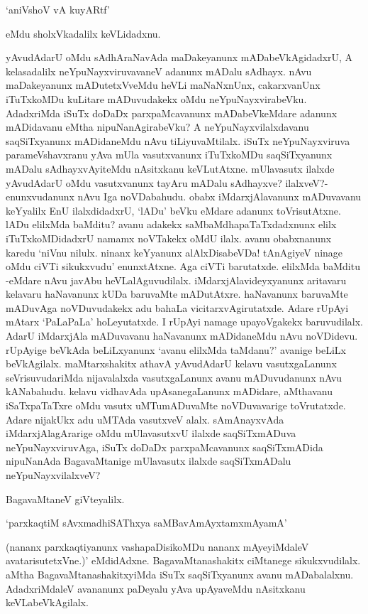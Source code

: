 \begin{shloka}
`aniVshoV vA kuyARtf'
\end{shloka}

eMdu sholxVkadalilx keVLidadxnu.

yAvudAdarU oMdu sAdhAraNavAda maDakeyanunx mADabeVkAgidadxrU, A kelasadalilx neYpuNayxviruvavaneV adanunx mADalu sAdhayx. nAvu maDakeyanunx mADutetxVveMdu heVLi maNaNxnUnx, cakarxvanUnx iTuTxkoMDu kuLitare mADuvudakekx oMdu neYpuNayxvirabeVku. AdadxriMda iSuTx doDaDx parxpaMcavanunx mADabeVkeMdare adanunx mADidavanu eMtha nipuNanAgirabeVku? A neYpuNayxvilalxdavanu saqSiTxyanunx mADidaneMdu nAvu tiLiyuvaMtilalx. iSuTx neYpuNayxviruva parameVshavxranu yAva mUla vasutxvanunx iTuTxkoMDu saqSiTxyanunx mADalu sAdhayxvAyiteMdu nAsitxkanu keVLutAtxne. mUlavasutx ilalxde yAvudAdarU oMdu vasutxvanunx tayAru mADalu sAdhayxve? ilalxveV?- enunxvudanunx nAvu Iga noVDabahudu. obabx iMdarxjAlavanunx mADuvavanu keYyalilx EnU ilalxdidadxrU, `lADu' beVku eMdare adanunx toVrisutAtxne. lADu elilxMda baMditu? avanu adakekx saMbaMdhapaTaTxdadxnunx elilx iTuTxkoMDidadxrU namamx noVTakekx oMdU ilalx. avanu obabxnanunx karedu `niVnu nilulx. ninanx keYyanunx alAlxDisabeVDa! tAnAgiyeV ninage oMdu ciVTi sikukxvudu' enunxtAtxne. Aga ciVTi barutatxde. elilxMda baMditu -eMdare nAvu javAbu heVLalAguvudilalx. iMdarxjAlavideyxyanunx aritavaru kelavaru haNavanunx kUDa baruvaMte mADutAtxre. haNavanunx baruvaMte mADuvAga noVDuvudakekx adu bahaLa vicitarxvAgirutatxde. Adare rUpAyi mAtarx `PaLaPaLa' hoLeyutatxde. I rUpAyi namage upayoVgakekx baruvudilalx. AdarU iMdarxjAla mADuvavanu haNavanunx mADidaneMdu nAvu noVDidevu. rUpAyige beVkAda beLiLxyanunx `avanu elilxMda taMdanu?' avanige beLiLx beVkAgilalx. maMtarxshakitx athavA yAvudAdarU kelavu vasutxgaLanunx seVrisuvudariMda nijavalalxda vasutxgaLanunx avanu mADuvudanunx nAvu kANabahudu. kelavu vidhavAda upAsanegaLanunx mADidare, aMthavanu iSaTxpaTaTxre oMdu vasutx uMTumADuvaMte noVDuvavarige toVrutatxde. Adare nijakUkx adu uMTAda vasutxveV alalx. sAmAnayxvAda iMdarxjAlagArarige oMdu mUlavasutxvU ilalxde saqSiTxmADuva neYpuNayxviruvAga, iSuTx doDaDx parxpaMcavanunx saqSiTxmADida nipuNanAda BagavaMtanige mUlavasutx ilalxde saqSiTxmADalu neYpuNayxvilalxveV?

BagavaMtaneV giVteyalilx.

\begin{shloka}
`parxkaqtiM sAvxmadhiSAThxya saMBavAmAyxtamxmAyamA'
\end{shloka}

(nananx parxkaqtiyanunx vashapaDisikoMDu nananx mAyeyiMdaleV avatarisutetxVne.)' eMdidAdxne. BagavaMtanashakitx ciMtanege sikukxvudilalx. aMtha BagavaMtanashakitxyiMda iSuTx saqSiTxyanunx avanu mADabalalxnu. AdadxriMdaleV avananunx paDeyalu yAva upAyaveMdu nAsitxkanu keVLabeVkAgilalx.

